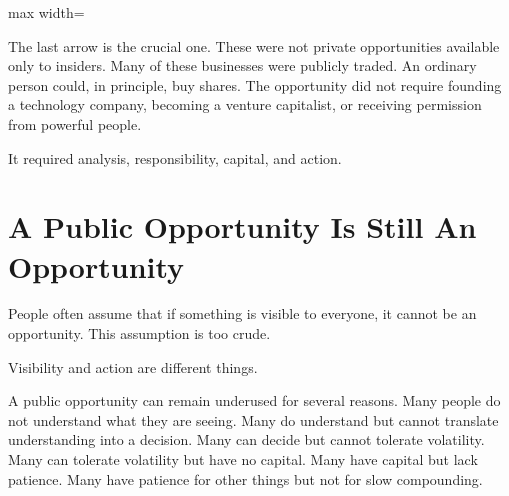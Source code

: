 \begin{center}
\begin{adjustbox}{max width=\linewidth}
\end{adjustbox}
\end{center}

The last arrow is the crucial one. These were not private opportunities available only to insiders. Many of these businesses were publicly traded. An ordinary person could, in principle, buy shares. The opportunity did not require founding a technology company, becoming a venture capitalist, or receiving permission from powerful people.

It required analysis, responsibility, capital, and action.

\section*{A Public Opportunity Is Still An Opportunity}

People often assume that if something is visible to everyone, it cannot be an opportunity. This assumption is too crude.

Visibility and action are different things.

A public opportunity can remain underused for several reasons. Many people do not understand what they are seeing. Many do understand but cannot translate understanding into a decision. Many can decide but cannot tolerate volatility. Many can tolerate volatility but have no capital. Many have capital but lack patience. Many have patience for other things but not for slow compounding.

